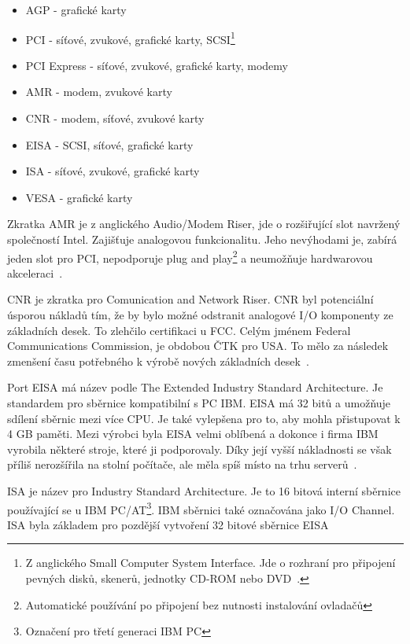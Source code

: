 \begin{itemize}
  \item AGP - grafické karty
  \item PCI - síťové, zvukové, grafické karty, SCSI\footnote{Z anglického
  Small Computer System Interface. Jde o rozhraní pro připojení pevných disků,
  skenerů, jednotky CD-ROM nebo DVD~\cite{ref:mb:webopedia2}.}
  \item PCI Express - síťové, zvukové, grafické karty, modemy
  \item AMR - modem, zvukové karty
  \item CNR - modem, síťové, zvukové karty
  \item EISA - SCSI, síťové, grafické karty
  \item ISA - síťové, zvukové, grafické karty
  \item VESA - grafické karty
\end{itemize}

Zkratka AMR je z anglického Audio/Modem Riser, jde o rozšiřující slot navržený
společností Intel. Zajišťuje analogovou funkcionalitu. Jeho nevýhodami je,
zabírá jeden slot pro PCI, nepodporuje plug and play\footnote{Automatické
používání po připojení bez nutnosti instalování ovladačů} a neumožňuje
hardwarovou akceleraci~\cite{ref:mb:pinouts}.

CNR je zkratka pro Comunication and Network Riser. CNR byl potenciální
úsporou nákladů tím, že by bylo možné odstranit analogové I/O komponenty
ze základních desek. To zlehčilo certifikaci u FCC. Celým jménem Federal
Communications Commission, je obdobou ČTK pro USA. To mělo za následek zmenšení
času potřebného k výrobě nových základních desek~\cite{ref:mb:pinouts2}.

Port EISA má název podle The Extended Industry Standard Architecture. Je
standardem pro sběrnice kompatibilní s PC IBM. EISA má 32 bitů a umožňuje sdílení
sběrnic mezi více CPU. Je také vylepšena pro to, aby mohla přistupovat k 4 GB paměti.
Mezi výrobci byla EISA velmi oblíbená a dokonce i firma IBM vyrobila některé
stroje, které ji podporovaly. Díky její vyšší nákladnosti se však příliš nerozšířila
na stolní počítače, ale měla spíš místo na trhu serverů~\cite{ref:mb:geekdot}.

ISA je název pro Industry Standard Architecture. Je to 16 bitová interní sběrnice
používající se u IBM PC/AT\footnote{Označení pro třetí generaci IBM PC}. IBM sběrnici také
označována jako I/O Channel. ISA byla základem pro pozdější vytvoření 32 bitové
sběrnice EISA~\cite{ref:mb:hardwarebook}

